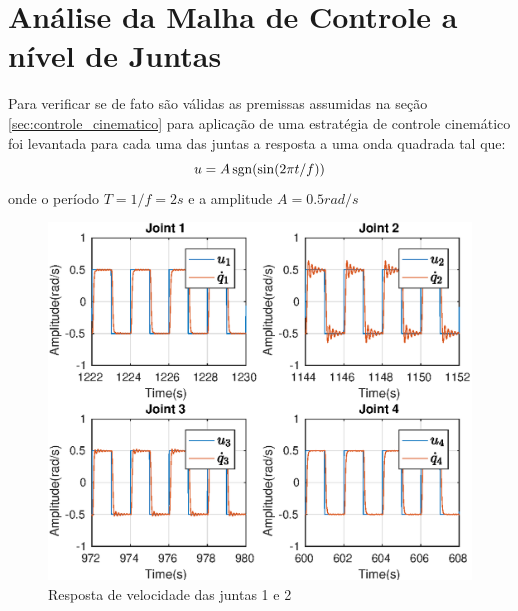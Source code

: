 \section{Análise da Malha de Controle a nível de Juntas}
Para verificar se de fato são válidas as premissas assumidas na seção \ref{sec:controle_cinematico} para aplicação de uma estratégia de controle cinemático foi levantada para cada uma das juntas a resposta a uma onda quadrada tal que:
\[ u = A \operatorname{sgn}(\sin( 2\pi t/f)) \]
onde o período $T = 1/f = 2s$ e a amplitude $A = 0.5 rad/s$

\newlength{\imageheight}
\begin{figure}[H]
  \centering
    \includegraphics[width=\textwidth, clip=true, trim = 0 0.5\imageheight 0 0 0 mm]{./img/internal_loop}
  \caption{Resposta de velocidade das juntas 1 e 2}
\end{figure}

